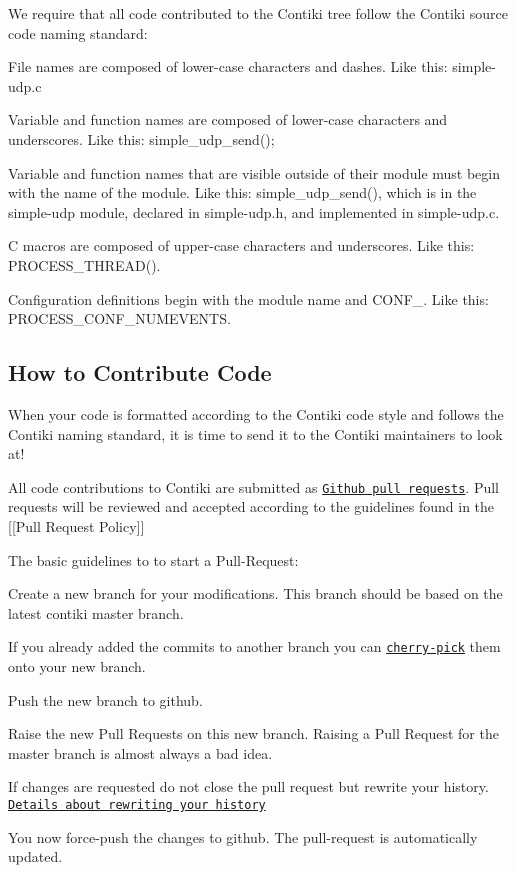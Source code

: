 We require that all code contributed to the Contiki tree follow the Contiki source code naming standard\+:


\begin{DoxyItemize}
\item File names are composed of lower-\/case characters and dashes. Like this\+: simple-\/udp.\+c
\item Variable and function names are composed of lower-\/case characters and underscores. Like this\+: simple\+\_\+udp\+\_\+send();
\item Variable and function names that are visible outside of their module must begin with the name of the module. Like this\+: simple\+\_\+udp\+\_\+send(), which is in the simple-\/udp module, declared in simple-\/udp.\+h, and implemented in simple-\/udp.\+c.
\item C macros are composed of upper-\/case characters and underscores. Like this\+: P\+R\+O\+C\+E\+S\+S\+\_\+\+T\+H\+R\+E\+A\+D().
\item Configuration definitions begin with the module name and C\+O\+N\+F\+\_\+. Like this\+: P\+R\+O\+C\+E\+S\+S\+\_\+\+C\+O\+N\+F\+\_\+\+N\+U\+M\+E\+V\+E\+N\+T\+S.
\end{DoxyItemize}

\subsection*{How to Contribute Code }

When your code is formatted according to the Contiki code style and follows the Contiki naming standard, it is time to send it to the Contiki maintainers to look at!

All code contributions to Contiki are submitted as \href{https://help.github.com/articles/using-pull-requests}{\tt Github pull requests}. Pull requests will be reviewed and accepted according to the guidelines found in the \mbox{[}\mbox{[}Pull Request Policy\mbox{]}\mbox{]}

The basic guidelines to to start a Pull-\/\+Request\+:
\begin{DoxyItemize}
\item Create a new branch for your modifications. This branch should be based on the latest contiki master branch.
\item If you already added the commits to another branch you can \href{http://git-scm.com/docs/git-cherry-pick}{\tt cherry-\/pick} them onto your new branch.
\item Push the new branch to github.
\item Raise the new Pull Requests on this new branch. Raising a Pull Request for the master branch is almost always a bad idea.
\item If changes are requested do not close the pull request but rewrite your history. \href{http://git-scm.com/book/en/Git-Tools-Rewriting-History}{\tt Details about rewriting your history}
\item You now force-\/push the changes to github. The pull-\/request is automatically updated.
\end{DoxyItemize}

